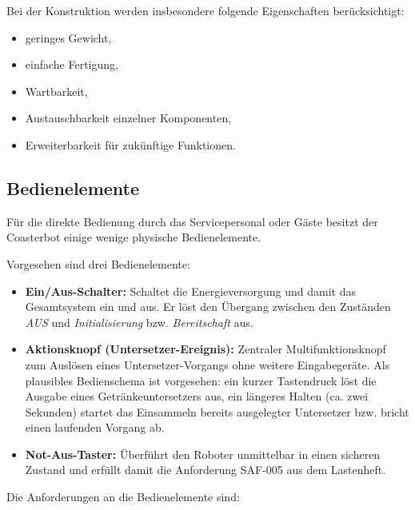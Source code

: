 \documentclass[
  a4paper,
  12pt,
  DIV=12,        %
  parskip=half,  %
  headings=small %
]{scrartcl}
\theoremstyle{definition}
\providecommand{\tightlist}{%
  \setlength{\itemsep}{0pt}\setlength{\parskip}{0pt}}
\theoremstyle{definition}
\begin{document}
Bei der Konstruktion werden insbesondere folgende Eigenschaften
berücksichtigt:

\begin{itemize}
\tightlist
\item
  geringes Gewicht,
\item
  einfache Fertigung,
\item
  Wartbarkeit,
\item
  Austauschbarkeit einzelner Komponenten,
\item
  Erweiterbarkeit für zukünftige Funktionen.
\end{itemize}

\subsection{Bedienelemente}\label{bedienelemente}

Für die direkte Bedienung durch das Servicepersonal oder Gäste besitzt
der Coasterbot einige wenige physische Bedienelemente.

Vorgesehen sind drei Bedienelemente:

\begin{itemize}
\tightlist
\item
  \textbf{Ein/Aus-Schalter:} Schaltet die Energieversorgung und damit
  das Gesamtsystem ein und aus. Er löst den Übergang zwischen den
  Zuständen \emph{AUS} und \emph{Initialisierung} bzw.
  \emph{Bereitschaft} aus.
\item
  \textbf{Aktionsknopf (Untersetzer-Ereignis):} Zentraler
  Multifunktionsknopf zum Auslösen eines Untersetzer-Vorgangs ohne
  weitere Eingabegeräte. Als plausibles Bedienschema ist vorgesehen: ein
  kurzer Tastendruck löst die Ausgabe eines Getränkeuntersetzers aus,
  ein längeres Halten (ca. zwei Sekunden) startet das Einsammeln bereits
  ausgelegter Untersetzer bzw. bricht einen laufenden Vorgang ab.
\item
  \textbf{Not-Aus-Taster:} Überführt den Roboter unmittelbar in einen
  sicheren Zustand und erfüllt damit die Anforderung SAF-005 aus dem
  Lastenheft.
\end{itemize}

Die Anforderungen an die Bedienelemente sind:
\end{document}
